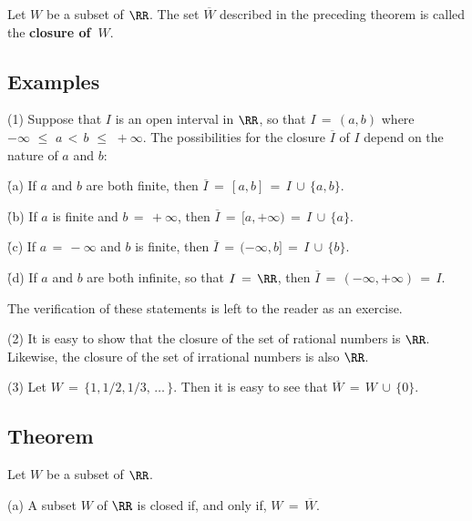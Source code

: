 {        Let $W$ be a subset of ${\RR}$.
    The set $\overline{W}$ described in the preceding theorem is called the {\bf closure of~$W$}.


\V

            \subsection{\small{\bf Examples}}
            \label{ExampC80.65}

        \hspace*{\parindent}(1) Suppose that $I$ is an open interval in ${\RR}$, so that $I \,=\, (a,b)$ where $-{\infty}\,\,{\leq}\,\,a\,<\,b\,\,{\leq}\,\,+{\infty}$.
    The possibilities for the closure $\overline{I}$ of $I$ depend on the nature of $a$ and $b$:

        \h (a) If $a$ and $b$ are both finite, then $\overline{I} \,=\, [a,b] \,=\, I\,{\cup}\,\{a,b\}$.

        \h (b) If $a$ is finite and $b \,=\, +{\infty}$, then $\overline{I} \,=\, [a,+{\infty}) \,=\, I\,{\cup}\,\{a\}$.

        \h (c) If $a \,=\, -{\infty}$ and $b$ is finite, then $\overline{I} \,=\, (-{\infty},b] \,=\, I\,{\cup}\,\{b\}$.

        \h (d) If $a$ and $b$ are both infinite, so that $I \,=\, {\RR}$, then $\overline{I} \,=\, (-{\infty},+{\infty}) \,=\, I$.

\noindent The verification of these statements is left to the reader as an exercise.

\V

        (2) It is easy to show that the closure of the set of rational numbers is ${\RR}$.
    Likewise, the closure of the set of irrational numbers is also ${\RR}$.

\V

        (3) Let $W \,=\, \{1, 1/2, 1/3, \,{\ldots}\,\}$. Then it is easy to see that $\overline{W} \,=\, W\,{\cup}\,\{0\}$.




            \subsection{\small{\bf Theorem}}
            \label{ThmC80.70}

        Let $W$ be a subset of ${\RR}$.

\V

        (a) A subset $W$ of ${\RR}$ is closed if, and only if, $W \,=\, \overline{W}$.
\V

}
